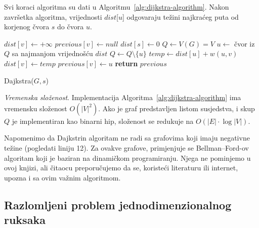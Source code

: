 \documentclass[b5paper, utf8, 11pt, colorlinks]{book}
\theoremstyle{definition}
\begin{document}
Svi koraci algoritma su dati u Algoritmu~\ref{alg:dijkstra-algorithm}. Nakon završetka algoritma, vrijednosti $dist$[$u$] odgovaraju težini najkraćeg puta od korjenog čvora $s$ do čvora $u$. 


\begin{algorithm}[!ht]
	\begin{algorithmic}[1]
	      	\STATE   $dist[v] \gets +\infty$ 	%
		    \STATE $previous[v] \gets null$ 	%
		\ENDFOR
		\STATE	$dist[s] \gets 0$ 	 
		\STATE	$Q \gets V(G)=V$
		\STATE $u \gets$ čvor iz $Q$ sa najmanjom vrijednošću $dist$
		\STATE $Q \gets Q \setminus \{u\}$
		\STATE $temp \gets dist[u] + w(u, v)$
		\STATE  $dist[v] \gets temp$
		\STATE $previous[v] \gets u$ 
		\ENDIF
		\ENDFOR
		\ENDWHILE
		\STATE	\textbf{return} $previous$ 
	\end{algorithmic}
    		\caption{Dajkstra($G,s $)}\label{alg:dijkstra-algorithm}
\end{algorithm}

\emph{Vremenska složenost}.  Implementacija Algoritma~\ref{alg:dijkstra-algorithm} ima vremensku složenost $O(|V|^2)$. Ako je graf predstavljen listom susjedstva, i skup $Q$  je implementiran kao binarni hip, 
složenost se redukuje na $O(|E| \cdot \log |V|)$.

Napomenimo da Dajkstrin algoritam ne radi sa grafovima koji imaju negativne težine (pogledati  liniju 12).  Za ovakve grafove,  primjenjuje se Bellman–Ford-ov algoritam koji je baziran na dinamičkom programiranju. Njega ne pominjemo   u ovoj knjizi, ali čitaocu preporučujemo da se, koristeći literaturu ili internet, upozna i sa ovim važnim algoritmom.  %


\subsection{Razlomljeni problem jednodimenzionalnog ruksaka}\label{sec:frkacruksak}
\end{document}
